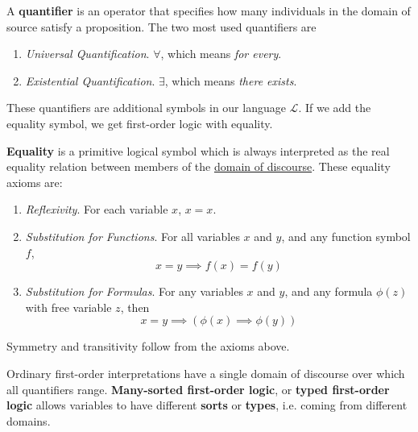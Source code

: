   \begin{definition}[Quantifier]
    \label{def:quantifier}
    A \textbf{quantifier} is an operator that specifies how many individuals in the domain of source satisfy a proposition. The two most used quantifiers are 
    \begin{enumerate}
      \item \textit{Universal Quantification}. $\forall$, which means \textit{for every}. 
      \item \textit{Existential Quantification}. $\exists$, which means \textit{there exists}. 
    \end{enumerate}
  \end{definition} 

  These quantifiers are additional symbols in our language $\mathcal{L}$. If we add the equality symbol, we get first-order logic with equality. 

  \begin{axiom}[Equality]
    \label{thm:equality}
    \textbf{Equality} is a primitive logical symbol which is always interpreted as the real equality relation between members of the \hyperref[def:domain-of-discourse]{domain of discourse}. These equality axioms are: 
    \begin{enumerate}
      \item \textit{Reflexivity}. For each variable $x$, $x = x$. 
      \item \textit{Substitution for Functions}. For all variables $x$ and $y$, and any function symbol $f$, 
        \begin{equation}
          x = y \implies f(x) = f(y)
        \end{equation}
      \item \textit{Substitution for Formulas}. For any variables $x$ and $y$, and any formula $\phi(z)$ with free variable $z$, then 
        \begin{equation}
          x = y \implies (\phi(x) \implies \phi(y))
        \end{equation}
    \end{enumerate}
    Symmetry and transitivity follow from the axioms above. 
  \end{axiom} 

  Ordinary first-order interpretations have a single domain of discourse over which all quantifiers range. \textbf{Many-sorted first-order logic}, or \textbf{typed first-order logic} allows variables to have different \textbf{sorts} or \textbf{types}, i.e. coming from different domains.  

